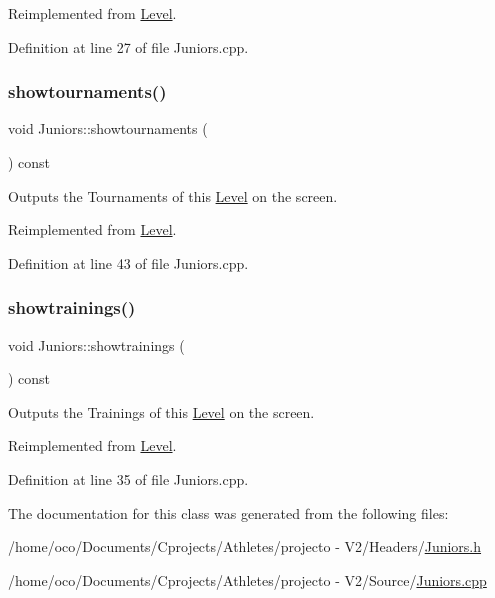 Reimplemented from \hyperlink{class_level_a40d22b376e72950a07de5e0a9e288029}{Level}.



Definition at line 27 of file Juniors.\+cpp.

\hypertarget{class_juniors_a05afe7596b708ad635ac709499e66bc1}{}\label{class_juniors_a05afe7596b708ad635ac709499e66bc1} 
\subsubsection{\texorpdfstring{showtournaments()}{showtournaments()}}
{\footnotesize\ttfamily void Juniors\+::showtournaments (\begin{DoxyParamCaption}{ }\end{DoxyParamCaption}) const\hspace{0.3cm}{\ttfamily [virtual]}}



Outputs the Tournaments of this \hyperlink{class_level}{Level} on the screen. 



Reimplemented from \hyperlink{class_level_a757c4547f3b8f7c7ecb02c7e0e6cd7c9}{Level}.



Definition at line 43 of file Juniors.\+cpp.

\hypertarget{class_juniors_ad74d069390fffeda607de3584a0453de}{}\label{class_juniors_ad74d069390fffeda607de3584a0453de} 
\subsubsection{\texorpdfstring{showtrainings()}{showtrainings()}}
{\footnotesize\ttfamily void Juniors\+::showtrainings (\begin{DoxyParamCaption}{ }\end{DoxyParamCaption}) const\hspace{0.3cm}{\ttfamily [virtual]}}



Outputs the Trainings of this \hyperlink{class_level}{Level} on the screen. 



Reimplemented from \hyperlink{class_level_a4101cb725b1fd0c0836834c92b190363}{Level}.



Definition at line 35 of file Juniors.\+cpp.



The documentation for this class was generated from the following files\+:\begin{DoxyCompactItemize}
\item 
/home/oco/\+Documents/\+Cprojects/\+Athletes/projecto -\/ V2/\+Headers/\hyperlink{_juniors_8h}{Juniors.\+h}\item 
/home/oco/\+Documents/\+Cprojects/\+Athletes/projecto -\/ V2/\+Source/\hyperlink{_juniors_8cpp}{Juniors.\+cpp}\end{DoxyCompactItemize}
